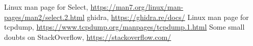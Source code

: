 \documentclass[a4paper,11pt]{article}
\begin{document}
\begin{thebibliography}{---}
 Linux man page for Select, \url{https://man7.org/linux/man-pages/man2/select.2.html}
 ghidra, 
\url{https://ghidra.re/docs/}
 Linux man page for tcpdump, 
\url{https://www.tcpdump.org/manpages/tcpdump.1.html}
 Some small doubts on StackOverflow,
\url{https://stackoverflow.com/}
\end{thebibliography}
\end{document}
